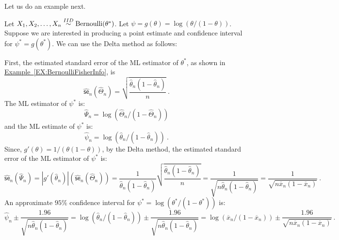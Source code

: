 Let us do an example next.
\begin{example}
Let $X_1,X_2,\ldots,X_n \overset{IID}{\sim} \mbox{{\rm Bernoulli}}(\theta^*)$.  Let $\psi=g(\theta)=\log(\theta/(1-\theta))$.  Suppose we are interested in producing a point estimate and confidence interval for $\psi^*=g(\theta^*)$.  We can use the Delta method as follows: 

First, the estimated standard error of the ML estimator of $\theta^*$, as shown in \hyperref[EX:BernoulliFisherInfo]{Example~\ref*{EX:BernoulliFisherInfo}}, is
\[
\widehat{\mathsf{se}}_n(\widehat{\Theta}_n) = \sqrt{\frac{\widehat{\theta}_n (1-\widehat{\theta}_n)}{n}} \ .
\]
The ML estimator of $\psi^*$ is:
$$\widehat{\Psi}_n=\log(\widehat{\Theta}_n / (1-\widehat{\Theta}_n))$$ 
and the ML estimate of $\psi^*$ is:
$$\widehat{\psi}_n=\log(\widehat{\theta}_n / (1-\widehat{\theta}_n)) \ .$$
Since, $g'(\theta) = 1/(\theta (1-\theta))$, by the Delta method, the estimated standard error of the ML estimator of $\psi^*$ is:
\[
\widehat{\mathsf{se}}_n(\widehat{\Psi}_n) = |g'(\widehat{\theta}_n)| (\widehat{\mathsf{se}}_n(\widehat{\Theta}_n))
= \frac{1}{\widehat{\theta}_n (1-\widehat{\theta}_n)} \sqrt{\frac{\widehat{\theta}_n (1-\widehat{\theta}_n)}{n}}
= \frac{1}{\sqrt{n\widehat{\theta}_n (1-\widehat{\theta}_n)}}
= \frac{1}{\sqrt{n \overline{x}_n (1-\overline{x}_n)}} \ .
\]
An approximate $95\%$ confidence interval for $\psi^*=\log(\theta^*/(1-\theta^*))$ is:
\[
\widehat{\psi}_n \pm \frac{1.96}{\sqrt{n \widehat{\theta}_n (1-\widehat{\theta}_n)}}
= \log(\widehat{\theta}_n / (1-\widehat{\theta}_n)) \pm \frac{1.96}{\sqrt{n \widehat{\theta}_n (1-\widehat{\theta}_n)}}
= \log(\overline{x}_n / (1-\overline{x}_n)) \pm \frac{1.96}{\sqrt{n \overline{x}_n (1-\overline{x}_n)}} \ .
\]
\end{example}


